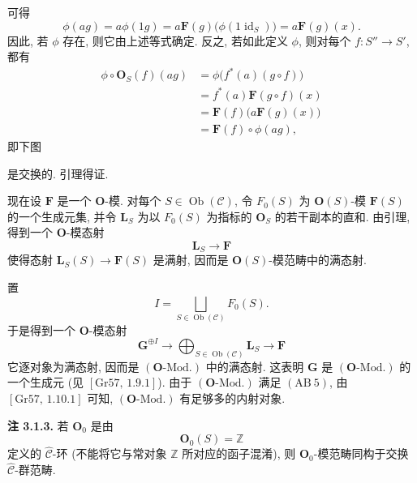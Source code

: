 \begin{center}
  
\end{center}

可得
\[
  \phi(ag)
    =a\phi(1g)
    =a\mathbf F(g)\bigl(\phi(1\operatorname{id}_S)\bigr)
    =a\mathbf F(g)(x).
\]
因此, 若 \(\phi\) 存在, 则它由上述等式确定.
反之, 若如此定义 \(\phi\), 则对每个 \(f:S''\to S'\), 都有
\begin{align*}
  \phi\circ\mathbf O_S(f)(ag)
    &=\phi\bigl(f^*(a)(g\circ f)\bigr)\\
    &=f^*(a)\mathbf F(g\circ f)(x)\\
    &=\mathbf F(f)\bigl(a\mathbf F(g)(x)\bigr)\\
    &=\mathbf F(f)\circ\phi(ag),
\end{align*}
即下图

\begin{center}
  
\end{center}

是交换的. 引理得证.

现在设 \(\mathbf F\) 是一个 \(\mathbf O\)-模.
对每个 \(S\in\operatorname{Ob}(\mathscr C)\), 令 \(F_0(S)\) 为
\(\mathbf O(S)\)-模 \(\mathbf F(S)\) 的一个生成元集, 并令
\(\mathbf L_S\) 为以 \(F_0(S)\) 为指标的 \(\mathbf O_S\) 的若干副本的直和.
由引理, 得到一个 \(\mathbf O\)-模态射
\[
  \mathbf L_S\longrightarrow\mathbf F
\]
使得态射 \(\mathbf L_S(S)\to\mathbf F(S)\) 是满射,
因而是 \(\mathbf O(S)\)-模范畴中的满态射.

置
\[
  I=\bigsqcup_{S\in\operatorname{Ob}(\mathscr C)}F_0(S).
\]
于是得到一个 \(\mathbf O\)-模态射
\[
  \mathbf G^{\oplus I}
    \longrightarrow
  \bigoplus_{S\in\operatorname{Ob}(\mathscr C)}\mathbf L_S
    \longrightarrow
  \mathbf F
\]
它逐对象为满态射, 因而是 \((\mathbf O\text{-Mod.})\) 中的满态射.
这表明 \(\mathbf G\) 是 \((\mathbf O\text{-Mod.})\) 的一个生成元
(见 \([\mathrm{Gr}57,\,1.9.1]\)). 由于
\((\mathbf O\text{-Mod.})\) 满足 \(\mathrm{(AB\ 5)}\),
由 \([\mathrm{Gr}57,\,1.10.1]\) 可知,
\((\mathbf O\text{-Mod.})\) 有足够多的内射对象.

\medskip
\noindent{}\textbf{注 3.1.3.}
若 \(\mathbf O_0\) 是由
\[
  \mathbf O_0(S)=\mathbb Z
\]
定义的 \(\widehat{\mathscr C}\)-环
(不能将它与常对象 \(\mathbb Z\) 所对应的函子混淆), 则
\(\mathbf O_0\)-模范畴同构于交换 \(\widehat{\mathscr C}\)-群范畴.


